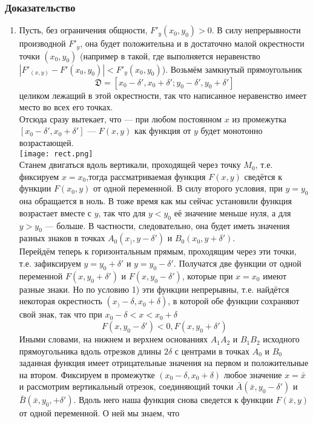 \subsubsection*{Доказательство}

\begin{enumerate}
    \item Пусть, без ограничения общности, $F'_y(x_0, y_0) > 0$. В силу непрерывности 
    производной $F'_y$, она будет положительна и в достаточно малой окрестности точки 
    $(x_0, y_0)$ (например в такой, где выполняется неравенство 
    $|F'_(x,y) - F'(x_0, y_0)| < F'_y(x_0, y_0)$). Возьмём замкнутый прямоугольник
    \begin{equation*}
        \mathfrak{D} = [x_0 - \delta', x_0 + \delta'; y_0 - \delta', y_0 + \delta']
    \end{equation*}
    целиком лежащий в этой окрестности, так что написанное неравенство имеет место во всех
    его точках.\\
    Отсюда сразу вытекает, что --- при любом постоянном $x$ из промежутка $[x_0 - \delta', x_0 + \delta']$ --- $F(x, y)$ как функция от $y$ будет монотонно возрастающей.\\
    \texttt{[image: rect.png]}\\
    Станем двигаться вдоль вертикали, проходящей через точку $M_0$, т.е. фиксируем $x = x_0$,тогда рассматриваемая функция $F(x, y)$ сведётся к функции $F(x_0, y)$ от одной переменной. В силу второго условия, при $y = y_0$ она обращается в ноль. В тоже время как мы сейчас установили функция возрастает вместе с $y$, так что для $y < y_0$ её значение меньше нуля, а для $y > y_0$ --- больше. В частности, следовательно, она будет иметь значения разных знаков в точках $A_0(x_), y - \delta')$ и $B_0(x_0, y + \delta')$.\\
    Перейдём теперь к горизонтальным прямым, проходящим через эти точки, т.е. зафиксируем $ y = y_0 + \delta'$ и $y = y_0 - \delta'$. Получатся две функции от одной переменной $F(x, y_0 + \delta')$ и $F(x, y_0 - \delta')$, которые при $x = x_0$ имеют разные знаки. Но по условию 1) эти функции непрерывны, т.е. найдётся некоторая окрестность $(x_) - \delta, x_0 + \delta)$, в которой обе функции сохраняют свой знак, так что при $x_0 -\delta < x < x_0 + \delta$
    \begin{equation*}
        F(x, y_0 - \delta') < 0, F(x, y_0 + \delta')
    \end{equation*}
    Иными словами, на нижнем и верхнем основаниях $A_1A_2$ и $B_1B_2$ исходного прямоугольника вдоль отрезков длины $2\delta$ с центрами в точках $A_0$ и $B_0$ заданная функция имеет отрицательные значения на первом и положительные на втором. Фиксируем в промежутке $(x_0 - \delta, x_0 + \delta)$ любое значение $x = \bar{x}$ и рассмотрим вертикальный отрезок, соединяющий точки $\bar{A}(\bar{x}, y_0 - \delta')$ и $\bar{B}(\bar{x}, y_0, + \delta')$. Вдоль него наша функция снова сведется к функции $F(\bar{x}, y)$ от одной переменной. О ней мы знаем, что

\end{enumerate}
